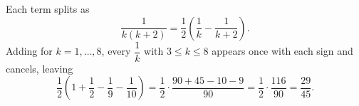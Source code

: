 Each term splits as
\[\dfrac{1}{k(k+2)}=\dfrac{1}{2}\left(\dfrac{1}{k}-\dfrac{1}{k+2}\right).\]
Adding for $k=1,\dots,8$, every $\dfrac{1}{k}$ with $3\le k\le8$ appears once with each sign and cancels, leaving
\[\dfrac{1}{2}\left(1+\dfrac{1}{2}-\dfrac{1}{9}-\dfrac{1}{10}\right)=\dfrac{1}{2}\cdot\dfrac{90+45-10-9}{90}=\dfrac{1}{2}\cdot\dfrac{116}{90}=\boxed{\dfrac{29}{45}}.\]
